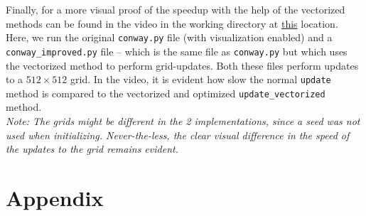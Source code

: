 \documentclass[a4paper,12pt]{article}
\begin{document}
Finally, for a more visual proof of the speedup with the help of the vectorized methods can be found in the video in the working directory at \href{}{this} location. Here, we run the original \verb|conway.py| file (with visualization enabled) and a \verb|conway_improved.py| file -- which is the same file as \verb|conway.py| but which uses the vectorized method to perform grid-updates. Both these files perform updates to a $512 \times 512$ grid. In the video, it is evident how slow the normal \verb|update| method is compared to the vectorized and optimized \verb|update_vectorized| method. \\
\textit{Note: The grids might be different in the 2 implementations, since a seed was not used when initializing. Never-the-less, the clear visual difference in the speed of the updates to the grid remains evident.}
\section{Appendix}


\end{document}

